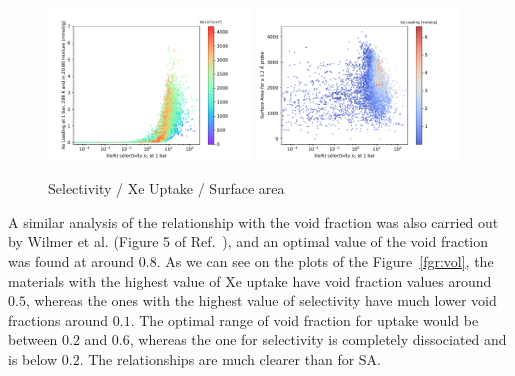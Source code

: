 \documentclass[main.tex]{subfiles}
\begin{document}
\begin{figure}[ht]
  \centering
  \includegraphics[width=0.48\textwidth]{figures/2-thermo/Scatterplot_uptake_selectivity_sa.pdf}
  \includegraphics[width=0.48\textwidth]{figures/2-thermo/Scatterplot_sa_selectivity.pdf}
  \caption{Selectivity / Xe Uptake / Surface area}\label{fgr:sa}
\end{figure}

A similar analysis of the relationship with the void fraction was also carried out by Wilmer et al. (Figure 5 of Ref.~), and an optimal value of the void fraction was found at around $0.8$. As we can see on the plots of the Figure~\ref{fgr:vol}, the materials with the highest value of Xe uptake have void fraction values around $0.5$, whereas the ones with the highest value of selectivity have much lower void fractions around $0.1$. The optimal range of void fraction for uptake would be between $0.2$ and $0.6$, whereas the one for selectivity is completely dissociated and is below $0.2$. The relationships are much clearer than for SA.

\end{document}
